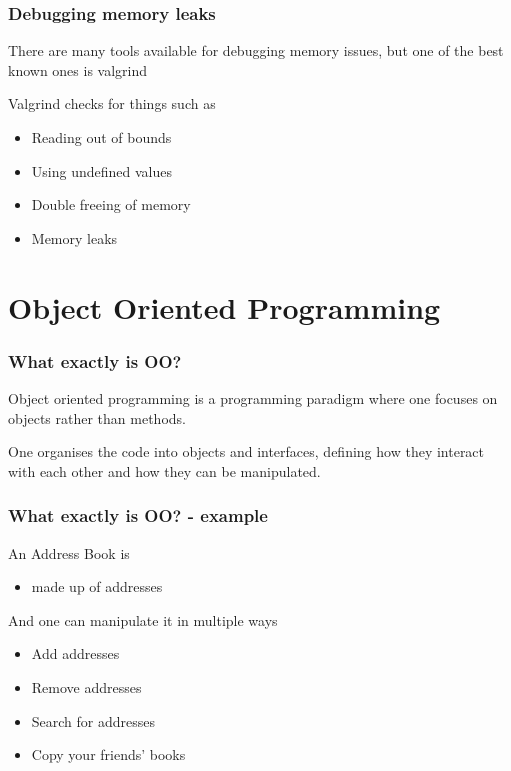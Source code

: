 \documentclass[14pt,a4paper,dvipsnames,usenames]{beamer}
\begin{document}
\begin{frame}
  \frametitle{Debugging memory leaks}

  There are many tools available for debugging memory issues, but one of the best known ones is {\color{Tropiteal}valgrind}

  \vspace{1em}
  Valgrind checks for things such as
  
  \vspace{.3em}
  \begin{itemize}
    \setlength\itemsep{.3em}
    \item Reading out of bounds
    \item Using undefined values
    \item Double freeing of memory
    \item Memory leaks
  \end{itemize}
  
\end{frame}

\section{Object Oriented Programming}

\frame[plain]{\sectionpage}

\begin{frame}
  \frametitle{What exactly is OO?}

  Object oriented programming is a programming paradigm where one focuses on objects rather than methods.

  \vspace{.5cm}
  One organises the code into objects and interfaces, defining how they interact with each other and how they can be manipulated.

\end{frame}

\begin{frame}
  \frametitle{What exactly is OO? - example}

  An {\color{FeebleWeek}Address Book} is

  \begin{itemize}
    \item made up of addresses
  \end{itemize}

  \vspace{.5em}
  And one can manipulate it in multiple ways

  \begin{itemize}
    \item Add addresses
    \item Remove addresses
    \item Search for addresses
    \item Copy your friends' books
  \end{itemize}

\end{frame}
\end{document}
